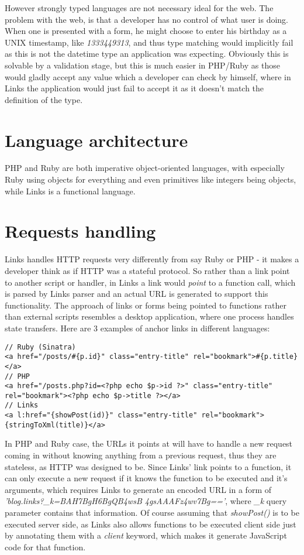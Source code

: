 However strongly typed languages are not necessary ideal for the web. The problem with the web, is that a developer has no control of what user is doing. When one is presented with a form, he might choose to enter his birthday as a UNIX timestamp, like \textit{1333449313}, and thus type matching would implicitly fail as this is not the datetime type an application was expecting. Obviously this is solvable by a validation stage, but this is much easier in PHP/Ruby as those would gladly accept any value which a developer can check by himself, where in Links the application would just fail to accept it as it doesn't match the definition of the type.

\section{Language architecture}

PHP and Ruby are both imperative object-oriented languages, with especially Ruby using objects for everything and even primitives like integers being objects, while Links is a functional language. 

\section{Requests handling}

Links handles HTTP requests very differently from say Ruby or PHP - it makes a developer think as if HTTP was a stateful protocol. So rather than a link point to another script or handler, in Links a link would \textit{point} to a function call, which is parsed by Links parser and an actual URL is generated to support this functionality. The approach of links or forms being pointed to functions rather than external scripts resembles a desktop application, where one process handles state transfers. Here are 3 examples of anchor links in different languages:

\begin{codelisting}
\begin{verbatim}
// Ruby (Sinatra)
<a href="/posts/#{p.id}" class="entry-title" rel="bookmark">#{p.title}</a>
// PHP
<a href="/posts.php?id=<?php echo $p->id ?>" class="entry-title" rel="bookmark"><?php echo $p->title ?></a>
// Links
<a l:href="{showPost(id)}" class="entry-title" rel="bookmark">{stringToXml(title)}</a>
\end{verbatim}
\end{codelisting}

In PHP and Ruby case, the URLs it points at will have to handle a new request coming in without knowing anything from a previous request, thus they are stateless, as HTTP was designed to be. Since Links' link points to a function, it can only execute a new request if it knows the function to be executed and it's arguments, which requires Links to generate an encoded URL in a form of \textit{'blog.links?\_k=BAH7BgH6BgQB4wsB 4gsAAAFz4wv7Bg=='}, where \textit{\_k} query parameter contains that information. Of course assuming that \textit{showPost()} is to be executed server side, as Links also allows functions to be executed client side just by annotating them with a \textit{client} keyword, which makes it generate JavaScript code for that function.

